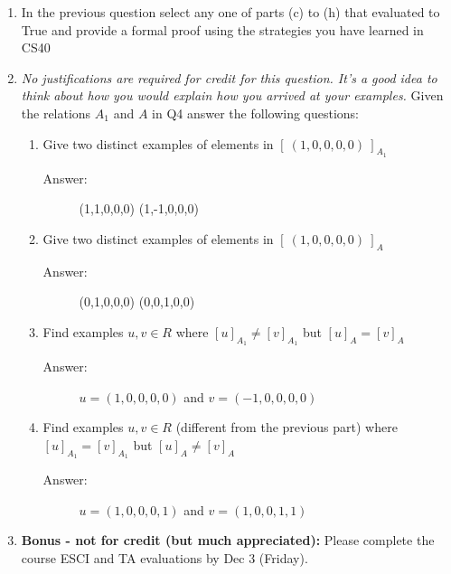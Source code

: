 \documentclass[12pt, oneside]{article}
\begin{document}
\begin{enumerate}
\item In the previous question select any one of parts (c) to (h) that evaluated to True and provide a formal proof using the strategies you have learned in CS40

\item {\it No justifications are required for credit for this question. It's a good idea to think about how you would explain how you arrived at your examples.} Given the relations $A_1$ and $A$ in Q4 answer the following questions:
\begin{enumerate}
    \item Give two distinct examples of elements in $[~(1,0,0,0,0)~]_{A_1}$
    \begin{description}
        \item[Answer:] (1,1,0,0,0) (1,-1,0,0,0)
    \end{description}
    \item Give two distinct examples of elements in $[~(1,0,0,0,0)~]_{A}$
    \begin{description}
        \item[Answer:] (0,1,0,0,0) (0,0,1,0,0)
    \end{description}
    \item Find examples $u, v \in R$ where $[ u]_{A_1} \neq [v]_{A_1}$ but $[ u]_{A} = [v]_{A}$ 
    \begin{description}
        \item[Answer:] $u = (1,0,0,0,0)$ and $v = (-1,0,0,0,0)$
    \end{description}
    \item Find examples $u, v \in R$ (different from the previous part) where $[ u]_{A_1} = [v]_{A_1}$ but $[ u]_{A} \neq [v]_{A}$ 
    \begin{description}
        \item[Answer:] $u = (1,0,0,0,1)$ and $v = (1,0,0,1,1)$
    \end{description}
\end{enumerate}

\item {\bf Bonus - not for credit (but much appreciated):} Please complete the course ESCI and TA evaluations by Dec 3 (Friday). 

\end{enumerate}
\end{document}
